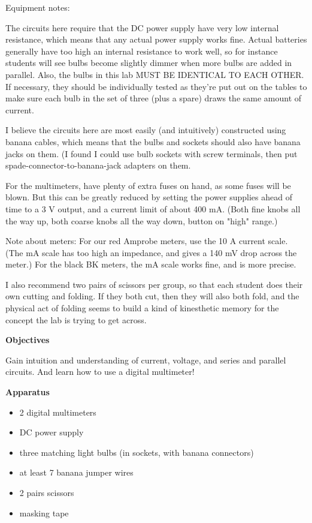 {Equipment notes: 

The circuits here require that the DC power supply have very low internal resistance, which means that any actual power supply works fine.  Actual batteries generally have too high an internal resistance to work well, so for instance students will see bulbs become slightly dimmer when more bulbs are added in parallel. Also, the bulbs in this lab MUST BE IDENTICAL TO EACH OTHER.  If necessary, they should be individually tested as they're put out on the tables to make sure each bulb in the set of three (plus a spare) draws the same amount of current. 

I believe the circuits here are most easily (and intuitively) constructed using banana cables, which means that the bulbs and sockets should also have banana jacks on them.  (I found I could use bulb sockets with screw terminals, then put spade-connector-to-banana-jack adapters on them.

For the multimeters, have plenty of extra fuses on hand, as some fuses will be blown.  But this can be greatly reduced by setting the power supplies ahead of time to a 3 V output, and a current limit of about 400 mA.  (Both fine knobs all the way up, both coarse knobs all the way down, button on "high" range.)

Note about meters: For our red Amprobe meters, use the 10 A current scale.  (The mA scale has too high an impedance, and gives a 140 mV drop across the meter.)  For the black BK meters, the mA scale works fine, and is more precise.

I also recommend two pairs of scissors per group, so that each student does their own cutting and folding.  If they both cut, then they will also both fold, and the physical act of folding seems to build a kind of kinesthetic memory for the concept the lab is trying to get across.


}

\makelabheader %

\medskip
\textbf{Objectives}

Gain intuition and understanding of current, voltage, and series and parallel circuits.  And learn how to use a digital multimeter!

\medskip
\textbf{Apparatus}
\begin{itemize}[nosep]
\item 2 digital multimeters 
\item DC power supply 
\item three matching light bulbs (in sockets, with banana connectors)
\item at least 7 banana jumper wires 
\item 2 pairs scissors
\item masking tape
\end{itemize}

